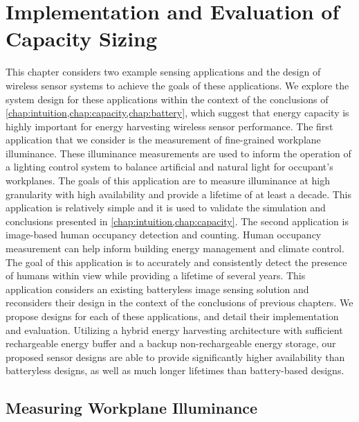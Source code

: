 \chapter{Implementation and Evaluation of Capacity Sizing}
\label{chap:permacam}

This chapter considers two example sensing applications and the design of wireless sensor systems to achieve the goals of these applications.
We explore the system design for these applications within the context of the conclusions of \cref{chap:intuition,chap:capacity,chap:battery}, which suggest that energy capacity is highly important for energy harvesting wireless sensor performance.
The first application that we consider is the measurement of fine-grained workplane illuminance. These illuminance measurements are used to inform the operation of a lighting control system to balance artificial and natural light for occupant's workplanes. 
The goals of this application are to measure illuminance at high granularity with high availability and provide a lifetime of at least a decade. 
This application is relatively simple and it is used to validate the simulation and conclusions presented in \cref{chap:intuition,chap:capacity}.
The second application is image-based human occupancy detection and counting. 
Human occupancy measurement can help inform building energy management and climate control.
The goal of this application is to accurately and consistently detect the presence of humans within view while providing a lifetime of several years.
This application considers an existing batteryless image sensing solution and reconsiders their design in the context of the conclusions of previous chapters.
We propose designs for each of these applications, and detail their implementation and evaluation.
Utilizing a hybrid energy harvesting architecture with sufficient rechargeable energy buffer and a backup non-rechargeable energy storage, our proposed sensor designs are able to provide significantly higher availability than batteryless designs, as well as much longer lifetimes than battery-based designs. 

\section{Measuring Workplane Illuminance}
\label{sec:impl:permamote}



